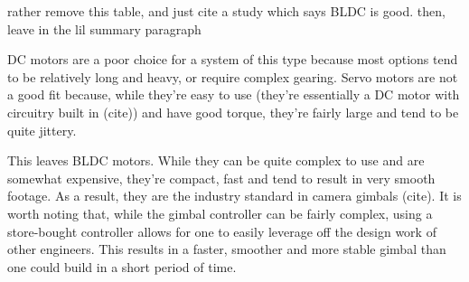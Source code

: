 {\color{red} rather remove this table, and just cite a study which says BLDC is good. then, leave in the lil summary paragraph}


DC motors are a poor choice for a system of this type because most options tend to be relatively long and heavy, or require complex gearing. Servo motors are not a good fit because, while they're easy to use (they're essentially a DC motor with circuitry built in {\color{red} (cite)}) and have good torque, they're fairly large and tend to be quite jittery.

This leaves BLDC motors. While they can be quite complex to use and are somewhat expensive, they're compact, fast and tend to result in very smooth footage. As a result, they are the industry standard in camera gimbals {\color{red} (cite)}. It is worth noting that, while the gimbal controller can be fairly complex, using a store-bought controller allows for one to easily leverage off the design work of other engineers. This results in a faster, smoother and more stable gimbal than one could build in a short period of time.

